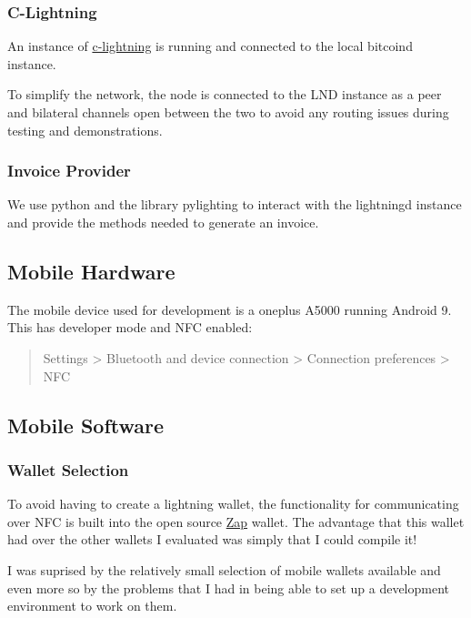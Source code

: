 \documentclass[a4paper]{article}
\begin{document}
\subsubsection{C-Lightning}
An instance of \href{https://github.com/ElementsProject/lightning}{c-lightning} is
running and connected to the local bitcoind instance.

To simplify the network, the node is connected to the LND instance as a peer and
bilateral channels open between the two to avoid any routing issues during testing
and demonstrations.

\subsubsection{Invoice Provider}
We use python and the library pylighting to interact with the lightningd instance and
provide the methods needed to generate an invoice.

\subsection{Mobile Hardware}
The mobile device used for development is a oneplus A5000 running Android 9.  This has
developer mode and NFC enabled:
\begin{quote}
Settings > Bluetooth and device connection > Connection preferences > NFC
\end{quote}

\subsection{Mobile Software}
\subsubsection{Wallet Selection}
To avoid having to create a lightning wallet, the functionality for communicating over
NFC is built into the open source \href{https://github.com/LN-Zap/zap-android}{Zap}
wallet.  The advantage that this wallet had over the other wallets I evaluated was
simply that I could compile it!

I was suprised by the relatively small selection of mobile wallets available and
even more so by the problems that I had in being able to set up a development
environment to work on them.
\end{document}
